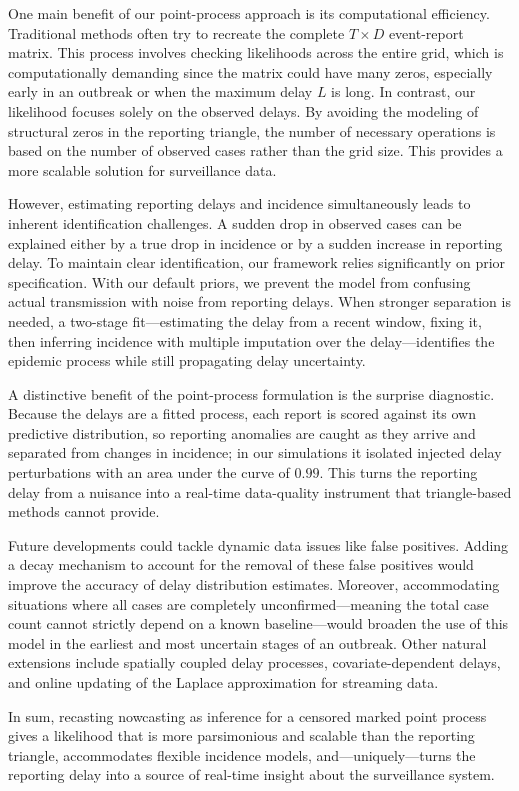 \documentclass[12pt]{article}
\begin{document}
One main benefit of our point-process approach is its computational efficiency. Traditional methods often try to recreate the complete $T \times D$ event-report matrix. This process involves checking likelihoods across the entire grid, which is computationally demanding since the matrix could have many zeros, especially early in an outbreak or when the maximum delay $L$ is long. In contrast, our likelihood focuses solely on the observed delays. By avoiding the modeling of structural zeros in the reporting triangle, the number of necessary operations is based on the number of observed cases rather than the grid size. This provides a more scalable solution for surveillance data. 

However, estimating reporting delays and incidence simultaneously leads to inherent identification challenges. A sudden drop in observed cases can be explained either by a true drop in incidence or by a sudden increase in reporting delay. To maintain clear identification, our framework relies significantly on prior specification. With our default priors, we prevent the model from confusing actual transmission with noise from reporting delays. {\color{red} When stronger separation is needed, a two-stage fit---estimating the delay from a recent window, fixing it, then inferring incidence with multiple imputation over the delay---identifies the epidemic process while still propagating delay uncertainty.}

{\color{red} A distinctive benefit of the point-process formulation is the surprise diagnostic. Because the delays are a fitted process, each report is scored against its own predictive distribution, so reporting anomalies are caught as they arrive and separated from changes in incidence; in our simulations it isolated injected delay perturbations with an area under the curve of $0.99$. This turns the reporting delay from a nuisance into a real-time data-quality instrument that triangle-based methods cannot provide.}

Future developments could tackle dynamic data issues like false positives. Adding a decay mechanism to account for the removal of these false positives would improve the accuracy of delay distribution estimates. Moreover, accommodating situations where all cases are completely unconfirmed—meaning the total case count cannot strictly depend on a known baseline—would broaden the use of this model in the earliest and most uncertain stages of an outbreak. {\color{red} Other natural extensions include spatially coupled delay processes, covariate-dependent delays, and online updating of the Laplace approximation for streaming data.}

{\color{red} In sum, recasting nowcasting as inference for a censored marked point process gives a likelihood that is more parsimonious and scalable than the reporting triangle, accommodates flexible incidence models, and---uniquely---turns the reporting delay into a source of real-time insight about the surveillance system.}







\end{document}
